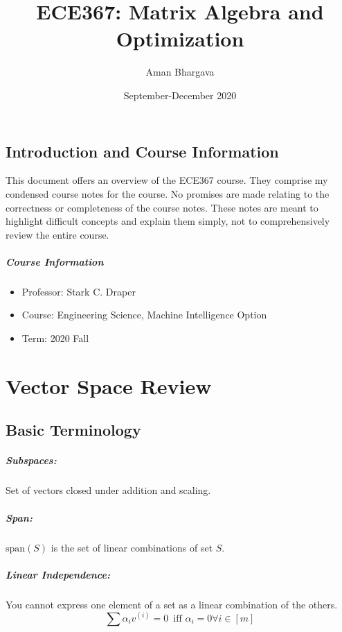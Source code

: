 \documentclass[a4paper,12pt]{report}
\begin{document}
\title{ECE367: Matrix Algebra and Optimization}
\author{Aman Bhargava}
\date{September-December 2020}
\maketitle

\tableofcontents

\section{Introduction and Course Information}

This document offers an overview of the ECE367 course. They comprise my condensed course notes for the course. No promises are made relating to the correctness or completeness of the course notes. These notes are meant to highlight difficult concepts and explain them simply, not to comprehensively review the entire course.

\paragraph{Course Information}
\begin{itemize}
\item Professor: Stark C. Draper
\item Course: Engineering Science, Machine Intelligence Option
\item Term: 2020 Fall
\end{itemize}




\chapter{Vector Space Review}

\section{Basic Terminology}

\paragraph{Subspaces: } Set of vectors closed under addition and scaling.
\paragraph{Span: } $\text{span}(S)$ is the set of linear combinations of set $S$.
\paragraph{Linear Independence: } You cannot express one element of a set as a linear combination of the others.
\begin{equation}
\sum \alpha_i v^{(i)} = 0\,\,\,\text{iff }\alpha_i =0 \forall i\in[m]
\end{equation}
\end{document}

